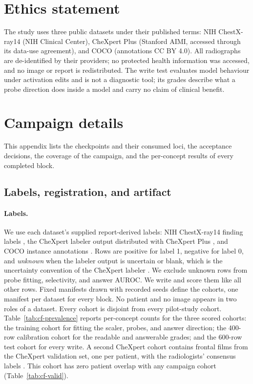 \documentclass{article}
\begin{document}
\section*{Ethics statement}
The study uses three public datasets under their published terms: NIH ChestX-ray14 (NIH Clinical Center), CheXpert Plus (Stanford AIMI, accessed through its data-use agreement), and COCO (annotations CC BY 4.0). All radiographs are de-identified by their providers; no protected health information was accessed, and no image or report is redistributed. The write test evaluates model behaviour under activation edits and is not a diagnostic tool; its grades describe what a probe direction does inside a model and carry no claim of clinical benefit.



\clearpage
\appendix
\section{Campaign details}
\label{app:campaign}

This appendix lists the checkpoints and their consumed loci, the acceptance decisions, the coverage of the campaign, and the per-concept results of every completed block.

\subsection{Labels, registration, and artifact}
\label{app:cf-labels}

\paragraph{Labels.} We use each dataset's supplied report-derived labels: NIH ChestX-ray14 finding labels \citep{wang2017chestxray}, the CheXpert labeler output \citep{irvin2019chexpert} distributed with CheXpert Plus \citep{chambon2024chexpertplus}, and COCO instance annotations \citep{lin2014coco}. Rows are positive for label 1, negative for label 0, and \emph{unknown} when the labeler output is uncertain or blank, which is the uncertainty convention of the CheXpert labeler \citep{irvin2019chexpert}. We exclude unknown rows from probe fitting, selectivity, and answer AUROC. We write and score them like all other rows. Fixed manifests drawn with recorded seeds define the cohorts, one manifest per dataset for every block. No patient and no image appears in two roles of a dataset. Every cohort is disjoint from every pilot-study cohort. Table~\ref{tab:cf-prevalence} reports per-concept counts for the three scored cohorts: the training cohort for fitting the scaler, probes, and answer direction; the 400-row calibration cohort for the readable and answerable grades; and the 600-row test cohort for every write. A second CheXpert cohort contains \cfValidRows{} frontal films from the CheXpert validation set, one per patient, with the radiologists' consensus labels \citep{irvin2019chexpert}. This cohort has zero patient overlap with any campaign cohort (Table~\ref{tab:cf-valid}).
\end{document}
